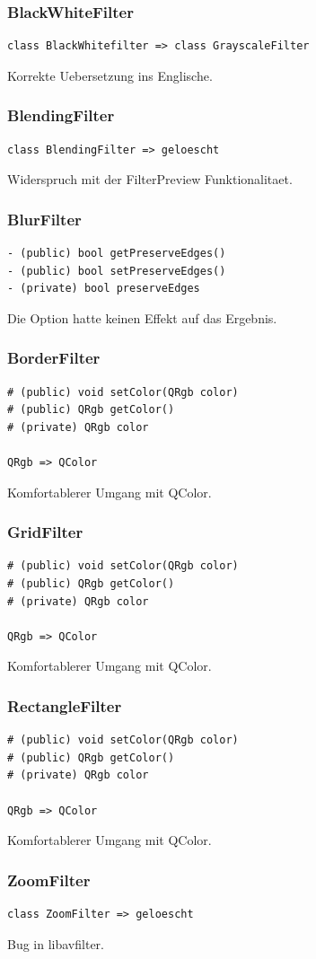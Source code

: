 \documentclass[parskip=full]{scrartcl}
\begin{document}
\subsubsection{BlackWhiteFilter}
\begin{verbatim}
class BlackWhitefilter => class GrayscaleFilter
\end{verbatim}
Korrekte Uebersetzung ins Englische.
\subsubsection{BlendingFilter}
\begin{verbatim}
class BlendingFilter => geloescht
\end{verbatim}
Widerspruch mit der FilterPreview Funktionalitaet.
\subsubsection{BlurFilter}
\begin{verbatim}
- (public) bool getPreserveEdges()
- (public) bool setPreserveEdges()
- (private) bool preserveEdges
\end{verbatim}
Die Option hatte keinen Effekt auf das Ergebnis.

\subsubsection{BorderFilter}
\begin{verbatim}
# (public) void setColor(QRgb color)
# (public) QRgb getColor()
# (private) QRgb color

QRgb => QColor
\end{verbatim}
Komfortablerer Umgang mit QColor.

\subsubsection{GridFilter}
\begin{verbatim}
# (public) void setColor(QRgb color)
# (public) QRgb getColor()
# (private) QRgb color

QRgb => QColor
\end{verbatim}
Komfortablerer Umgang mit QColor.
\subsubsection{RectangleFilter}
\begin{verbatim}
# (public) void setColor(QRgb color)
# (public) QRgb getColor()
# (private) QRgb color

QRgb => QColor
\end{verbatim}
Komfortablerer Umgang mit QColor.
\subsubsection{ZoomFilter}
\begin{verbatim}
class ZoomFilter => geloescht
\end{verbatim}
Bug in libavfilter.
\end{document}
